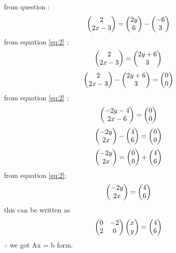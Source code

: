 \documentclass[journal,12pt,twocolumn]{IEEEtran}
\begin{document}
      from question :
      \begin{align}
      \begin{pmatrix}2\\2x-3 \end{pmatrix} = \begin{pmatrix}2y\\6\end{pmatrix} - \begin{pmatrix}-6\\3\end{pmatrix} 
      \end{align}
      from equation \eqref{eq:2} ;
      \begin{align}
      \begin{pmatrix}2\\2x-3 \end{pmatrix} = \begin{pmatrix}2y+6\\3\end{pmatrix}
      \end{align}
      \begin{align}
      \begin{pmatrix}2\\2x-3 \end{pmatrix} - \begin{pmatrix}2y+6\\3\end{pmatrix} = \begin{pmatrix}0\\0\end{pmatrix}
      \end{align}
      from equation \eqref{eq:2} ;
      \begin{align}
      \begin{pmatrix}-2y-4\\2x-6 \end{pmatrix} = \begin{pmatrix}0\\0\end{pmatrix}
      \end{align}
      \begin{align}
      \begin{pmatrix}-2y\\2x\end{pmatrix} -\begin{pmatrix}4\\6\end{pmatrix} = \begin{pmatrix}0\\0\end{pmatrix}
      \end{align}
      \begin{align}
      \begin{pmatrix}-2y\\2x \end{pmatrix} = \begin{pmatrix}0\\0\end{pmatrix} + \begin{pmatrix}4\\6\end{pmatrix}
      \end{align}
      from equation \eqref{eq:2};
      \begin{align}
      \begin{pmatrix}-2y\\2x \end{pmatrix} = \begin{pmatrix}4\\6\end{pmatrix}
      \end{align}
      this can be written as 
     \begin{align}
     \begin{pmatrix}0 & -2\\2 & 0\end{pmatrix} \begin{pmatrix}x\\y\end{pmatrix}= \begin{pmatrix}4\\6\end{pmatrix}
     \end{align}
     $\therefore$ we got Ax = b form.  
\end{document}
